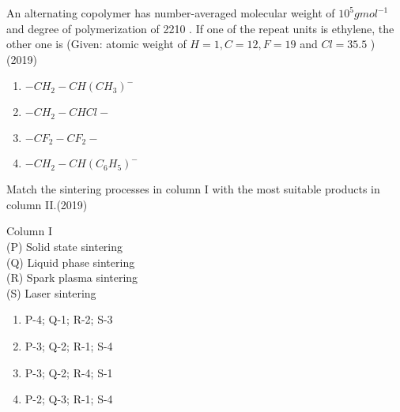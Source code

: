   
\iffalse
\chapter{2019}
\author{Prajwal naik}
\section{xe}
\fi





\item An alternating copolymer has number-averaged molecular weight of $10^{5} g {mol}^{-1}$ and degree of polymerization of 2210 . If one of the repeat units is ethylene, the other one is
	(Given: atomic weight of ${H}=1, {C}=12, {F}=19$ and ${Cl}=35.5$ )\hfill{(2019)}
        \begin{multicols}{1}
            \begin{enumerate}
                \item $-{CH}_{2}-{CH}\left({CH}_{3}\right)^{-}$
                \item  $-{CH}_{2}-{CHCl}-$
                \item $-{CF}_{2}-{CF}_{2}-$
                \item$-{CH}_{2}-{CH}\left({C}_{6} {H}_{5}\right)^{-}$
            \end{enumerate}
        \end{multicols}


    \item Match the sintering processes in column I with the most suitable products in column II.\hfill{(2019)}

    Column I\\
 (P) Solid state sintering\\
(Q) Liquid phase sintering\\
 (R) Spark plasma sintering\\
 (S) Laser sintering\\


		\begin{multicols}{1}
			\begin{enumerate}
	\item P-4; Q-1; R-2; S-3
\item  P-3; Q-2; R-1; S-4
\item P-3; Q-2; R-4; S-1
\item  P-2; Q-3; R-1; S-4
			\end{enumerate}
		\end{multicols}



